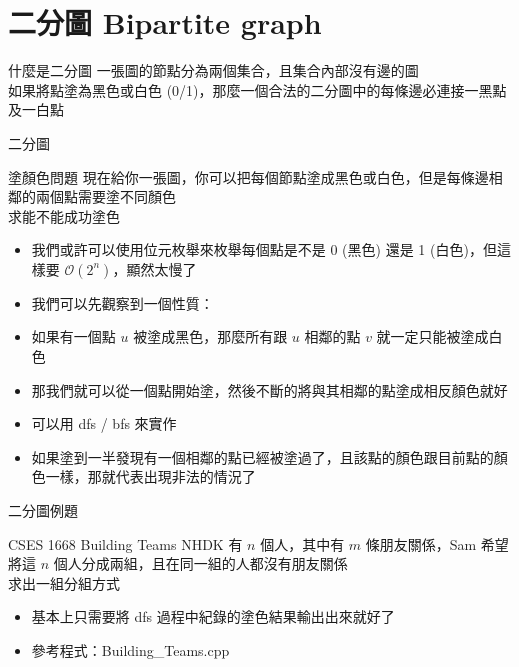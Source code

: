 \documentclass[aspectratio=169]{beamer}
\begin{document}
    \section{二分圖 Bipartite graph}

    \begin{frame}{什麼是二分圖}
        一張圖的節點分為兩個集合，且集合內部沒有邊的圖\\
        如果將點塗為黑色或白色 (0/1)，那麼一個合法的二分圖中的每條邊必連接一黑點及一白點
    \end{frame}

    \begin{frame}{二分圖}
        \begin{block}{塗顏色問題}
            現在給你一張圖，你可以把每個節點塗成黑色或白色，但是每條邊相鄰的兩個點需要塗不同顏色\\
            求能不能成功塗色
        \end{block}

        \begin{itemize}
            \item<1-> 我們或許可以使用位元枚舉來枚舉每個點是不是 0 (黑色) 還是 1 (白色)，但這樣要 $\mathcal{O}(2^n)$，顯然太慢了
            \item<2-> 我們可以先觀察到一個性質：
            \item<2-> 如果有一個點 $u$ 被塗成黑色，那麼所有跟 $u$ 相鄰的點 $v$ 就一定只能被塗成白色
            \item<3-> 那我們就可以從一個點開始塗，然後不斷的將與其相鄰的點塗成相反顏色就好
            \item<3-> 可以用 dfs / bfs 來實作
            \item<4-> 如果塗到一半發現有一個相鄰的點已經被塗過了，且該點的顏色跟目前點的顏色一樣，那就代表出現非法的情況了
        \end{itemize}
    \end{frame}

    \begin{frame}{二分圖例題}
        \begin{block}{CSES 1668 Building Teams}
            NHDK 有 $n$ 個人，其中有 $m$ 條朋友關係，Sam 希望將這 $n$ 個人分成兩組，且在同一組的人都沒有朋友關係\\
            求出一組分組方式
        \end{block}

        \begin{itemize}
            \item 基本上只需要將 dfs 過程中紀錄的塗色結果輸出出來就好了
            \item 參考程式：Building\_Teams.cpp
        \end{itemize}
    \end{frame}
\end{document}
